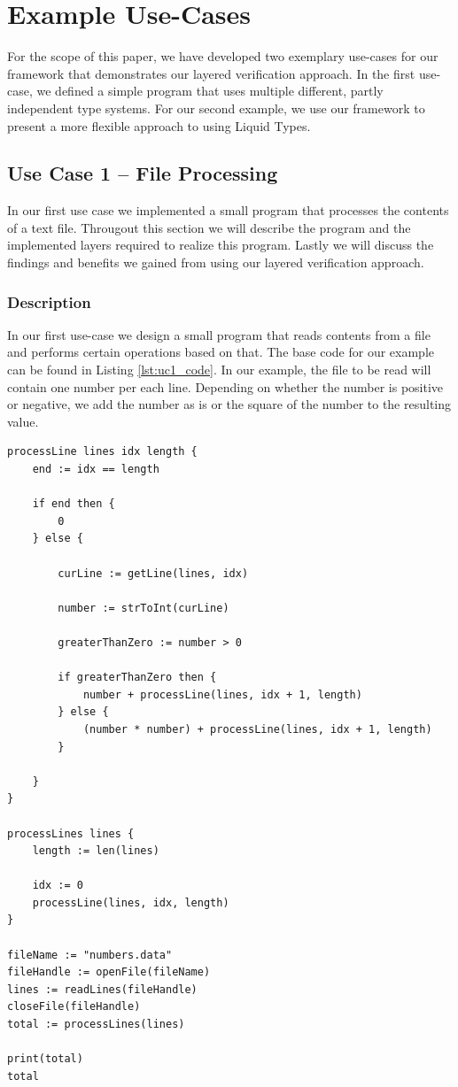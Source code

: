 \documentclass[acmsmall, review, screen]{acmart}
\begin{document}
\section{Example Use-Cases}
\label{ssec:use_cases}
For the scope of this paper, we have developed two exemplary use-cases for our framework that demonstrates our layered verification approach. In the first use-case, we defined a simple program that uses multiple different, partly independent type systems. For our second example, we use our framework to present a more flexible approach to using Liquid Types.

\subsection{Use Case 1 -- File Processing}
\label{sssec:use_case_1}

In our first use case we implemented a small program that processes the contents of a text file. Througout this section we will describe the program and the implemented layers required to realize this program. Lastly we will discuss the findings and benefits we gained from using our layered verification approach.

\subsubsection{Description}
In our first use-case we design a small program that reads contents from a file and performs certain operations based on that. The base code for our example can be found in Listing \ref{lst:uc1_code}. In our example, the file to be read will contain one number per each line. Depending on whether the number is positive or negative, we add the number as is or the square of the number to the resulting value.

\begin{lstlisting}
processLine lines idx length {
    end := idx == length

    if end then {
        0
    } else {

        curLine := getLine(lines, idx)

        number := strToInt(curLine)

        greaterThanZero := number > 0

        if greaterThanZero then {
            number + processLine(lines, idx + 1, length)
        } else {
            (number * number) + processLine(lines, idx + 1, length)
        }

    }
}

processLines lines {
    length := len(lines)

    idx := 0
    processLine(lines, idx, length)
}

fileName := "numbers.data"
fileHandle := openFile(fileName)
lines := readLines(fileHandle)
closeFile(fileHandle)
total := processLines(lines)

print(total)
total

\end{lstlisting}
\end{document}
